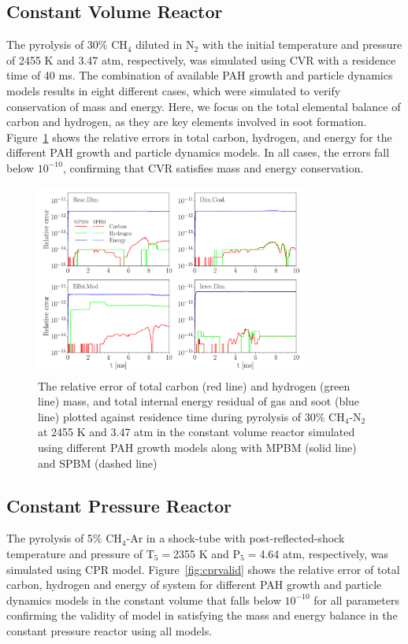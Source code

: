\subsection{Constant Volume Reactor}
The pyrolysis of 30\% $\mathrm{CH_4}$ diluted in $\mathrm{N_2}$ with the initial temperature and pressure of 2455 K and 3.47 atm, respectively, was simulated using CVR with a residence time of 40 ms. The combination of available PAH growth and particle dynamics models results in eight different cases, which were simulated to verify conservation of mass and energy. Here, we focus on the total elemental balance of carbon and hydrogen, as they are key elements involved in soot formation.
Figure~\ref{fig:constuvvalid} shows the relative errors in total carbon, hydrogen, and energy for the different PAH growth and particle dynamics models. In all cases, the errors fall below $\mathrm{10^{-10}}$, confirming that CVR satisfies mass and energy conservation.
\begin{figure}[H]
	\centering
	\includegraphics[width=0.8\textwidth]{Figures/Results/Validation/ConstUV/relerr_constuv.pdf}
	\caption{The relative error of total carbon (red line) and hydrogen (green line) mass, and total internal energy residual of gas and soot (blue line) plotted against residence time during pyrolysis of 30\% $\mathrm{CH_4}$-$\mathrm{N_2}$ at 2455 K and 3.47 atm in the constant volume reactor simulated using different PAH growth models along with MPBM (solid line) and SPBM (dashed line)}
	\label{fig:constuvvalid}
\end{figure}


\subsection{Constant Pressure Reactor}
The pyrolysis of 5\% $\mathrm{CH_4}$-Ar in a shock-tube with post-reflected-shock temperature and pressure of $\mathrm{T_5}=$2355 K and $\mathrm{P_5}=$4.64 atm, respectively, was simulated using CPR model. Figure~\ref{fig:cprvalid} shows the relative error of total carbon, hydrogen and energy of system for different PAH growth and particle dynamics models in the constant volume that falls below $\mathrm{10^{-10}}$ for all parameters confirming the validity of model in satisfying the mass and energy balance in the constant pressure reactor using all models.

